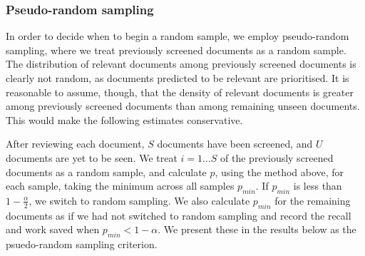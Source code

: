 \documentclass{bmcart}
\begin{document}
%	
%	


	\subsubsection*{Pseudo-random sampling}
	
	In order to decide when to begin a random sample, we employ pseudo-random sampling, where we treat previously screened documents as a random sample. The distribution of relevant documents among previously screened documents is clearly not random, as documents predicted to be relevant are prioritised. It is reasonable to assume, though, that the density of relevant documents is greater among previously screened documents than among remaining unseen documents. This would make the following estimates conservative. 
	
	After reviewing each document, $S$ documents have been screened, and $U$ documents are yet to be seen. We treat $i = 1 \dots S$ of the previously screened documents as a random sample, and calculate $p$, using the method above, for each sample, taking the minimum across all samples $p_{min}$. If $p_{min}$ is less than $1-\frac{\alpha}{2}$, we switch to random sampling. We also calculate $p_{min}$ for the remaining documents as if we had not switched to random sampling and record the recall and work saved when $p_{min} < 1 - \alpha$. We present these in the results below as the psuedo-random sampling criterion.
\end{document}
